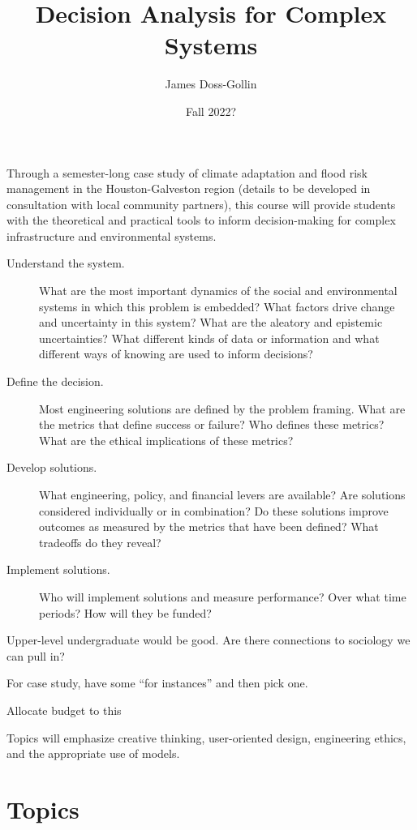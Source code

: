 \documentclass[12pt]{article}
\title{Decision Analysis for Complex Systems}
\author{James Doss-Gollin}
\date{Fall 2022?}
\begin{document}
\maketitle
\RaggedRight


Through a semester-long case study of climate adaptation and flood risk management in the Houston-Galveston region (details to be developed in consultation with local community partners), this course will provide students with the theoretical and practical tools to inform decision-making for complex infrastructure and environmental systems.
\begin{description}
	\item[Understand the system.] What are the most important dynamics of the social and environmental systems in which this problem is embedded? What factors drive change and uncertainty in this system? What are the aleatory and epistemic uncertainties? What different kinds of data or information and what different ways of knowing are used to inform decisions?
	\item[Define the decision.] Most engineering solutions are defined by the problem framing.  What are the metrics that define success or failure? Who defines these metrics? What are the ethical implications of these metrics?
	\item[Develop solutions.] What engineering, policy, and financial levers are available? Are solutions considered individually or in combination? Do these solutions improve outcomes as measured by the metrics that have been defined? What tradeoffs do they reveal?
	\item[Implement solutions.] Who will implement solutions and measure performance? Over what time periods? How will they be funded?
\end{description}

Upper-level undergraduate would be good.
Are there connections to sociology we can pull in?

For case study, have some ``for instances'' and then pick one.

Allocate budget to this

Topics will emphasize creative thinking, user-oriented design, engineering ethics, and the appropriate use of models.

\section{Topics}
\end{document}
